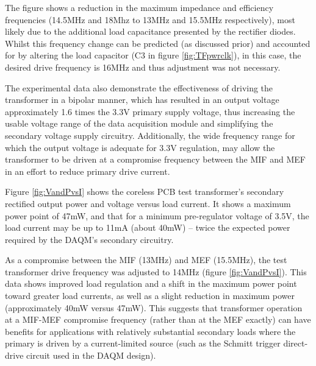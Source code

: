 \documentclass[conference]{IEEEtran}
\begin{document}
	The figure shows a reduction in the maximum impedance and efficiency frequencies (14.5MHz and 18Mhz to 13MHz and 15.5MHz respectively), most likely due to the additional load capacitance presented by the rectifier diodes.  Whilst this frequency change can be predicted (as discussed prior) and accounted for by altering the load capacitor (C3 in figure \ref{fig:TFpwrclk}), in this case, the desired drive frequency is 16MHz and thus adjustment was not necessary.
	
	The experimental data also demonstrate the effectiveness of driving the transformer in a bipolar manner, which has resulted in an output voltage approximately 1.6 times the 3.3V primary supply voltage, thus increasing the usable voltage range of the data acquisition module and simplifying the secondary voltage supply circuitry.  Additionally, the wide frequency range for which the output voltage is adequate for 3.3V regulation, may allow the transformer to be driven at a compromise frequency between the MIF and MEF in an effort to reduce primary drive current.
	
	Figure \ref{fig:VandPvsI} shows the coreless PCB test transformer's secondary rectified output power and voltage versus load current.  It shows a maximum power point of 47mW, and that for a minimum pre-regulator voltage of 3.5V, the load current may be up to 11mA (about 40mW) -- twice the expected power required by the DAQM's secondary circuitry.
	
	As a compromise between the MIF (13MHz) and MEF (15.5MHz), the test transformer drive frequency was adjusted to 14MHz (figure \ref{fig:VandPvsI}).  This data shows improved load regulation and a shift in the maximum power point toward greater load currents, as well as a slight reduction in maximum power (approximately 40mW versus 47mW).  This suggests that transformer operation at a MIF-MEF compromise frequency (rather than at the MEF exactly) can have benefits for applications with relatively substantial secondary loads where the primary is driven by a current-limited source (such as the Schmitt trigger direct-drive circuit used in the DAQM design).
\end{document}
